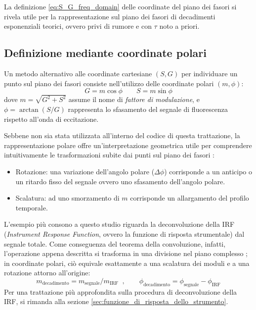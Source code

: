 La definizione \ref{eq:S_G_freq_domain} delle coordinate del piano dei fasori si rivela utile per la rappresentazione sul piano dei fasori di decadimenti esponenziali teorici, ovvero privi di rumore e con $\tau$ noto a priori.\\




\subsection{Definizione mediante coordinate polari}
\label{sec:definizione_mediante_coordinate_polari}
Un metodo alternativo alle coordinate cartesiane $(S, G)$ per individuare un punto sul piano dei fasori consiste nell'utilizzo delle coordinate polari $(m, \phi)$:
\begin{equation*}
    G = m \cos \phi \qquad S = m \sin \phi
\end{equation*}
dove $m=\sqrt{G^2 + S^2}$ assume il nome di \textit{fattore di modulazione}, e $\phi = \arctan{(S/G)}$ rappresenta lo sfasamento del segnale di fluorescenza rispetto all'onda di eccitazione.

Sebbene non sia stata utilizzata all'interno del codice di questa trattazione, la rappresentazione polare offre un'interpretazione geometrica utile per comprendere intuitivamente le trasformazioni subite dai punti sul piano dei fasori \cite{malacridaPhasorPlotUniversal2021}:
\begin{itemize}[parsep=4pt]
    \item Rotazione: una variazione dell'angolo polare ($\Delta \phi$) corrisponde a un anticipo o un ritardo fisso del segnale
    ovvero uno sfasamento dell'angolo polare.
    \item Scalatura: ad uno smorzamento di $m$ corrisponde un allargamento del profilo temporale.
\end{itemize}
L'esempio più consono a questo studio riguarda la deconvoluzione della IRF (\textit{Instrument Response Function}, ovvero la funzione di risposta strumentale) dal segnale totale. Come conseguenza del teorema della convoluzione, infatti, l'operazione appena descritta si trasforma in una divisione nel piano complesso \cite[Sez. 2.9.6]{oppenheim_discrete_2009}; in coordinate polari, ciò equivale esattamente a una scalatura dei moduli e a una rotazione attorno all'origine:
\begin{equation*}
    m_{\text{decadimento}} = m_{\text{segnale}} / m_{\text{IRF}}\;\;, \qquad \phi_{\text{decadimento}} = \phi_{\text{segnale}} - \phi_{\text{IRF}}
\end{equation*}
Per una trattazione più approfondita sulla procedura di deconvoluzione della IRF, si rimanda alla sezione \ref{sec:funzione_di_risposta_dello_strumento}.\\

